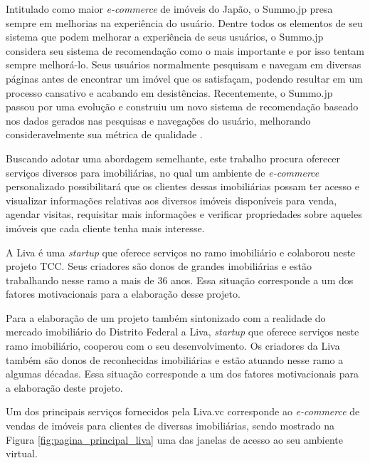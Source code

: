 Intitulado como maior \textit{e-commerce} de imóveis do Japão, o Summo.jp presa sempre em melhorias na experiência do usuário. Dentre todos os elementos de seu sistema que podem melhorar a experiência de seus usuários, o Summo.jp considera seu sistema de recomendação como o mais importante e por isso tentam sempre melhorá-lo. Seus usuários normalmente pesquisam e navegam em diversas páginas antes de encontrar um imóvel que os satisfaçam, podendo resultar em um processo cansativo e acabando em desistências. Recentemente, o Summo.jp passou por uma evolução e construiu um novo
sistema de recomendação baseado nos dados gerados nas pesquisas e navegações do usuário, melhorando consideravelmente sua métrica de qualidade \cite{Summo:2017}.

Buscando adotar uma abordagem semelhante, este trabalho procura oferecer serviços diversos para imobiliárias, no qual um ambiente de \textit{e-commerce} personalizado possibilitará que os clientes dessas imobiliárias possam ter acesso e visualizar informações relativas aos diversos imóveis disponíveis para venda, agendar visitas, requisitar mais informações e verificar propriedades sobre aqueles imóveis que cada cliente tenha mais interesse.

A Liva é uma \textit{startup} que oferece serviços no ramo imobiliário e colaborou neste projeto TCC. Seus criadores são donos de grandes imobiliárias e estão trabalhando nesse ramo a mais de 36 anos. Essa situação corresponde a um dos fatores motivacionais para a elaboração desse projeto.

Para a elaboração de um projeto também sintonizado com a realidade do mercado imobiliário do Distrito Federal a Liva, \textit{startup} que oferece serviços neste ramo imobiliário, cooperou com o seu desenvolvimento. Os criadores da Liva também são donos de reconhecidas imobiliárias e estão atuando nesse ramo a algumas décadas. Essa situação corresponde a um dos fatores motivacionais para a elaboração deste projeto.

Um dos principais serviços fornecidos pela Liva.vc corresponde ao \textit{e-commerce} de vendas de imóveis para clientes de diversas imobiliárias, sendo mostrado na Figura \ref{fig:pagina_principal_liva} uma das janelas de acesso ao seu ambiente virtual.

